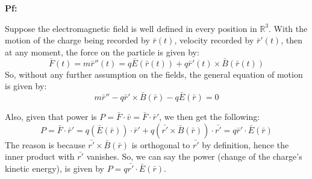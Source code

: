 \documentclass{article}
\begin{document}
\textbf{Pf:}

Suppose the electromagnetic field is well defined in every position in $\mathbb{R}^3$. With the motion of the charge being recorded by $\bar{r}(t)$,
velocity recorded by $\bar{r}'(t)$, then at any moment, the force on the particle is given by:
$$\bar{F}(t) = m\bar{r}''(t)=q\bar{E}(\bar{r}(t))+q\bar{r}'(t)\times \bar{B}(\bar{r}(t))$$
So, without any further assumption on the fields, the general equation of motion is given by:
$$m\bar{r}''-q\bar{r}'\times \bar{B}(\bar{r})-q\bar{E}(\bar{r}) = 0$$

\hfil

Also, given that power is $P=\bar{F}\cdot \bar{v} = \bar{F}\cdot \bar{r}'$, we then get the following:
$$P=\bar{F}\cdot \bar{r}' = q(\bar{E}(\bar{r}))\cdot \bar{r}' + q(\bar{r'}\times \bar{B}(\bar{r}))\cdot \bar{r'} = q\bar{r}'\cdot \bar{E}(\bar{r})$$
The reason is because $\bar{r'}\times \bar{B}(\bar{r})$ is orthogonal to $\bar{r'}$ by definition, hence the inner product with $\bar{r'}$ vanishes.
So, we can say the power (change of the charge's kinetic energy), is given by $P=q\bar{r'}\cdot \bar{E}(\bar{r})$.
\end{document}

